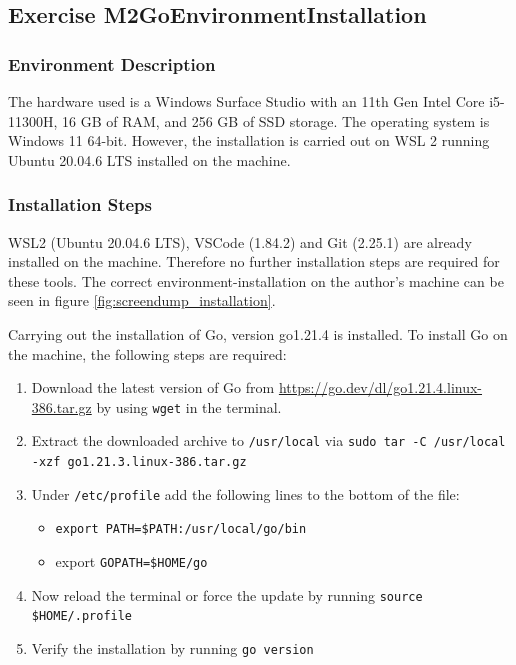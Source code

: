 \label{sec:exercise_install_go_env}

\subsection{Exercise M2GoEnvironmentInstallation}
\label{sec:exercise_m2go_environment_installation}

\subsubsection*{Environment Description}
The hardware used is a Windows Surface Studio with an 11th Gen Intel Core i5-11300H, 16 GB of RAM, and 256 GB of SSD storage.
The operating system is Windows 11 64-bit. However, the installation is carried out on WSL 2 running Ubuntu 20.04.6 LTS installed on the machine.

\subsubsection*{Installation Steps}
WSL2 (Ubuntu 20.04.6 LTS), VSCode (1.84.2) and Git (2.25.1) are already installed on the machine. 
Therefore no further installation steps are required for these tools.
The correct environment-installation on the author's machine can be seen in figure \ref{fig:screendump_installation}.

Carrying out the installation of Go, version go1.21.4 is installed.
To install Go on the machine, the following steps are required:
\begin{enumerate}
    \item Download the latest version of Go from \url{https://go.dev/dl/go1.21.4.linux-386.tar.gz} by using  \texttt{wget} in the terminal.
    \item Extract the downloaded archive to \texttt{/usr/local} via \texttt{sudo tar -C /usr/local -xzf go1.21.3.linux-386.tar.gz}
    \item Under \texttt{/etc/profile} add the following lines to the bottom of the file: 
    \begin{itemize}
        \item \texttt{export PATH=\$PATH:/usr/local/go/bin}
        \item export \texttt{GOPATH=\$HOME/go}
    \end{itemize}
    \item Now reload the terminal or force the update by running \texttt{source \$HOME/.profile}
    \item Verify the installation by running \texttt{go version}
\end{enumerate}

